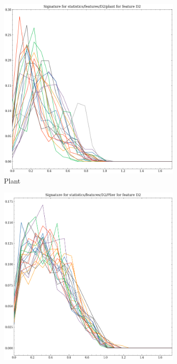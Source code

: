 \begin{figure}
    \centering
      \begin{subfigure}[b]{0.23\textwidth}
        \includegraphics[width=\textwidth]{assets/feature_extraction/D2/plant.png}
        \caption{Plant}
    \end{subfigure}
    \hfill
    \begin{subfigure}[b]{0.23\textwidth}
        \includegraphics[width=\textwidth]{assets/feature_extraction/D2/Plier.png}

\end{subfigure}
\end{figure}
